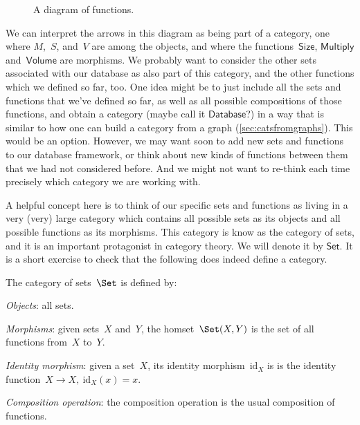 \begin{figure}[h!]
\begin{center}
\end{center}
\caption{A diagram of functions. \label{fig:diagram_functions}}
\end{figure}

We can interpret the arrows in this diagram as being part of a category, one where $M$,~$S$, and~$V$ are among the objects, and where the functions~$\mathsf{Size}$, $\mathsf{Multiply}$ and~$\mathsf{Volume}$ are morphisms. We probably want to consider the other sets associated with our database as also part of this category, and the other functions which we defined so far, too. One idea might be to just include all the sets and functions that we've defined so far, as well as all possible compositions of those functions, and obtain a category (maybe call it $\mathsf{Database}$?) in a way that is similar to how one can build a category from a graph (\cref{sec:catsfromgraphs}). This would be an option. However, we may want soon to add new sets and functions to our database framework, or think about new kinds of functions between them that we had not considered before. And we might not want to re-think each time precisely which category we are working with.

A helpful concept here is to think of our specific sets and functions as living in a very (very) large category which contains all possible sets as its objects and all possible functions as its morphisms. This category is know as the category of sets, and it is an important protagonist in category theory. We will denote it by $\mathsf{Set}$. It is a short exercise to check that the following does indeed define a category.

\begin{shaded*}
\begin{definition}
The category of sets~$\Set$ is defined by:
    \begin{compactenum}
    \item \emph{Objects}: all sets.
    \item \emph{Morphisms}: given sets~$X$ and~$Y$, the homset~$\Set(X,Y)$ is the set of all functions from~$X$ to~$Y$.
    \item \emph{Identity morphism}: given a set~$X$, its identity morphism~$\text{id}_X$ is
    is the identity function~$X \to X, \ \text{id}_X(x) = x$.
    \item \emph{Composition operation}: the composition operation is the usual composition of functions.
    \end{compactenum}
\end{definition}
\end{shaded*}


